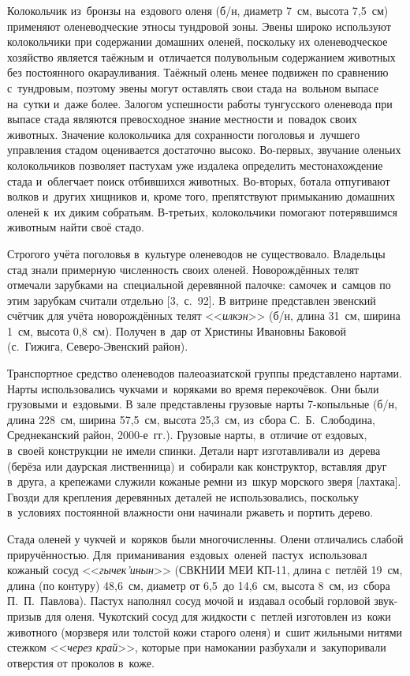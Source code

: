 Колокольчик из~бронзы на~ездового оленя (б/н, диаметр 7~см, высота 7,5~см) применяют оленеводческие этносы тундровой зоны. Эвены широко используют колокольчики при содержании домашних оленей, поскольку их оленеводческое хозяйство является таёжным и~отличается полувольным содержанием животных без постоянного окарауливания. Таёжный олень менее подвижен по сравнению с~тундровым, поэтому эвены могут оставлять свои стада на~вольном выпасе на~сутки и~даже более. Залогом успешности работы тунгусского оленевода при выпасе стада являются превосходное знание местности и~повадок своих животных. Значение колокольчика для сохранности поголовья и~лучшего управления стадом оценивается достаточно высоко. Во-первых, звучание оленьих колокольчиков позволяет пастухам уже издалека определить местонахождение стада и~облегчает поиск отбившихся животных. Во-вторых, ботала отпугивают волков и~других хищников и, кроме того, препятствуют примыканию домашних оленей к~их диким собратьям. В-третьих, колокольчики помогают потерявшимся животным найти своё стадо.

Строгого учёта поголовья в~культуре оленеводов не существовало. Владельцы стад знали примерную численность своих оленей. Новорождённых телят отмечали зарубками на~специальной деревянной палочке: самочек и~самцов по этим зарубкам считали отдельно [3,~с.~92]. В витрине представлен эвенский счётчик для учёта новорождённых телят <<\textit{илкэн}>> (б/н, длина 31~см, ширина 1~см, высота 0,8~см). Получен в~дар от Христины Ивановны Баковой (с.~Гижига, Северо-Эвенский район).

Транспортное средство оленеводов палеоазиатской группы представлено нартами. Нарты использовались чукчами и~коряками во время перекочёвок. Они были грузовыми и~ездовыми. В зале представлены грузовые нарты 7-копыльные (б/н, длина 228~см, ширина 57,5~см, высота 25,3~см, из~сбора С.~Б.~Слободина, Среднеканский район, 2000-е~гг.). Грузовые нарты, в~отличие от ездовых, в~своей конструкции не имели спинки. Детали нарт изготавливали из~дерева (берёза или даурская лиственница) и~собирали как конструктор, вставляя друг в~друга, а крепежами служили кожаные ремни из~шкур морского зверя [лахтака]. Гвозди для крепления деревянных деталей не использовались, поскольку в~условиях постоянной влажности они начинали ржаветь и портить дерево.

Стада оленей у чукчей и~коряков были многочисленны. Олени отличались слабой приручённостью. Для\,\,\,приманивания\,\,\,ездовых\,\,\,оленей\,\,\,пастух\,\,\,использовал кожаный сосуд <<\textit{гычек'инын}>> (СВКНИИ МЕИ КП-11, длина с~петлёй 19~см, длина (по контуру) 48,6~см, диаметр от 6,5~до 14,6~см, высота 8~см, из~сбора П.~П.~Павлова). Пастух наполнял сосуд мочой и~издавал особый горловой звук-призыв для оленя. Чукотский сосуд для жидкости с~петлей изготовлен из~кожи животного (морзверя или толстой кожи старого оленя) и~сшит жильными нитями стежком <<\textit{через край}>>, которые при намокании разбухали и~закупоривали отверстия от проколов в~коже.

